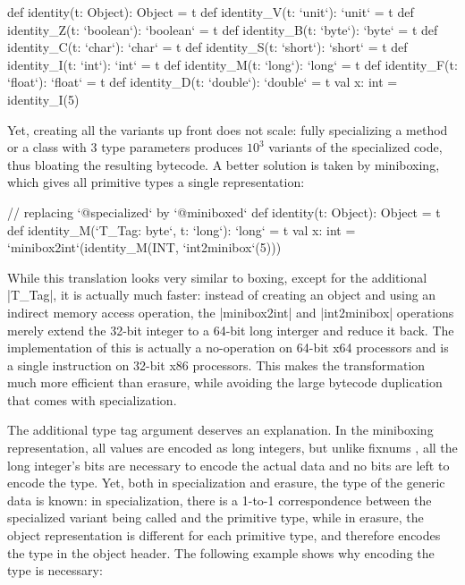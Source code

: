 \begin{lstlisting-nobreak}
 def identity(t: Object): Object = t
 def identity_V(t: `unit`): `unit` = t
 def identity_Z(t: `boolean`): `boolean` = t
 def identity_B(t: `byte`): `byte` = t
 def identity_C(t: `char`): `char` = t
 def identity_S(t: `short`): `short` = t
 def identity_I(t: `int`): `int` = t
 def identity_M(t: `long`): `long` = t
 def identity_F(t: `float`): `float` = t
 def identity_D(t: `double`): `double` = t
 val x: int = identity_I(5)
\end{lstlisting-nobreak}

Yet, creating all the variants up front does not scale: fully specializing a method or a class with 3 type parameters produces $10^3$ variants of the specialized code, thus bloating the resulting bytecode. A better solution is taken by miniboxing, which gives all primitive types a single representation:

\begin{lstlisting-nobreak}
 // replacing `@specialized` by `@miniboxed`
 def identity(t: Object): Object = t
 def identity_M(`T_Tag: byte`, t: `long`): `long` = t
 val x: int =
     `minibox2int`(identity_M(INT, `int2minibox`(5)))
\end{lstlisting-nobreak}

While this translation looks very similar to boxing, except for the additional |T_Tag|, it is actually much faster: instead of creating an object and using an indirect memory access operation, the |minibox2int| and |int2minibox| operations merely extend the 32-bit integer to a 64-bit long interger and reduce it back. The implementation of this is actually a no-operation on 64-bit x64 processors and is a single instruction on 32-bit x86 processors. This makes the transformation much more efficient than erasure, while avoiding the large bytecode duplication that comes with specialization.

The additional type tag argument deserves an explanation. In the miniboxing representation, all values are encoded as long integers, but unlike fixnums \cite{fixnums-lisp}, all the long integer's bits are necessary to encode the actual data and no bits are left to encode the type. Yet, both in specialization and erasure, the type of the generic data is known: in specialization, there is a 1-to-1 correspondence between the specialized variant being called and the primitive type, while in erasure, the object representation is different for each primitive type, and therefore encodes the type in the object header. The following example shows why encoding the type is necessary:

